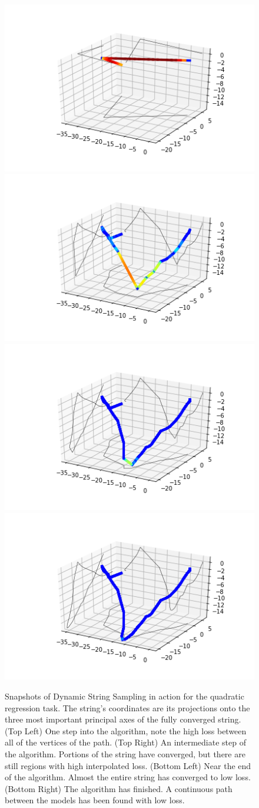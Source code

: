 \begin{figure}
\label{connfigs}
\centering
\includegraphics[width=.4\textwidth]{../Plots/conn1}
\includegraphics[width=.4\textwidth]{../Plots/conn2}
\includegraphics[width=.4\textwidth]{../Plots/conn3}
\includegraphics[width=.4\textwidth]{../Plots/conn4}
\caption{Snapshots of Dynamic String Sampling in action for the quadratic regression task.  The string's coordinates are its projections onto the three most important principal axes of the fully converged string.  (Top Left) One step into the algorithm, note the high loss between all of the vertices of the path. (Top Right) An intermediate step of the algorithm.  Portions of the string have converged, but there are still regions with high interpolated loss. (Bottom Left) Near the end of the algorithm.  Almost the entire string has converged to low loss.  (Bottom Right) The algorithm has finished.  A continuous path between the models has been found with low loss.} 
\end{figure}
 
 


